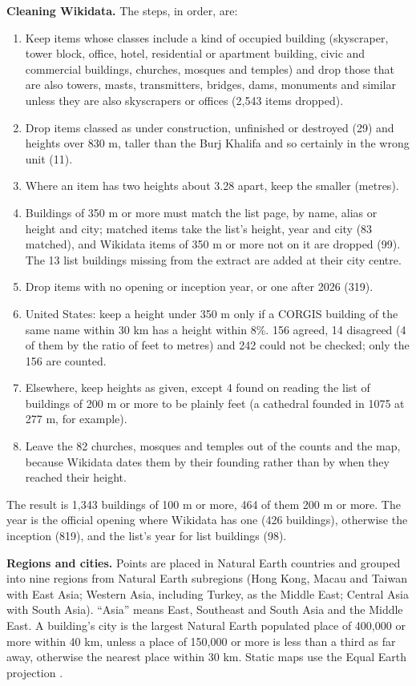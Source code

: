\documentclass[11pt,a4paper]{article}
\begin{document}
\textbf{Cleaning Wikidata.} The steps, in order, are:
\begin{enumerate}
\item Keep items whose classes include a kind of occupied building (skyscraper, tower block, office, hotel, residential or apartment building, civic and commercial buildings, churches, mosques and temples) and drop those that are also towers, masts, transmitters, bridges, dams, monuments and similar unless they are also skyscrapers or offices (2,543 items dropped).
\item Drop items classed as under construction, unfinished or destroyed (29) and heights over 830 m, taller than the Burj Khalifa and so certainly in the wrong unit (11).
\item Where an item has two heights about 3.28 apart, keep the smaller (metres).
\item Buildings of 350 m or more must match the list page, by name, alias or height and city; matched items take the list's height, year and city (83 matched), and Wikidata items of 350 m or more not on it are dropped (99). The 13 list buildings missing from the extract are added at their city centre.
\item Drop items with no opening or inception year, or one after 2026 (319).
\item United States: keep a height under 350 m only if a CORGIS building of the same name within 30 km has a height within 8\%. 156 agreed, 14 disagreed (4 of them by the ratio of feet to metres) and 242 could not be checked; only the 156 are counted.
\item Elsewhere, keep heights as given, except 4 found on reading the list of buildings of 200 m or more to be plainly feet (a cathedral founded in 1075 at 277 m, for example).
\item Leave the 82 churches, mosques and temples out of the counts and the map, because Wikidata dates them by their founding rather than by when they reached their height.
\end{enumerate}
The result is 1,343 buildings of 100 m or more, 464 of them 200 m or more. The year is the official opening where Wikidata has one (426 buildings), otherwise the inception (819), and the list's year for list buildings (98).

\textbf{Regions and cities.} Points are placed in Natural Earth countries and grouped into nine regions from Natural Earth subregions (Hong Kong, Macau and Taiwan with East Asia; Western Asia, including Turkey, as the Middle East; Central Asia with South Asia). ``Asia'' means East, Southeast and South Asia and the Middle East. A building's city is the largest Natural Earth populated place of 400,000 or more within 40 km, unless a place of 150,000 or more is less than a third as far away, otherwise the nearest place within 30 km. Static maps use the Equal Earth projection \citep{equalearth}.
\end{document}

